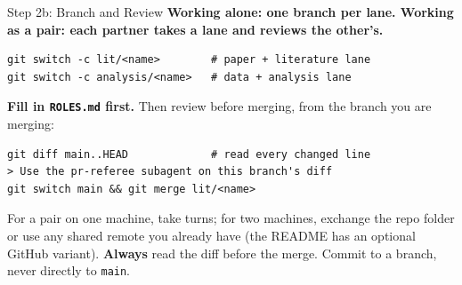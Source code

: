 \documentclass[aspectratio=169, 11pt]{beamer}
\begin{document}
\begin{frame}[fragile]{Step 2b: Branch and Review}
  \textbf{Working alone: one branch per lane. Working as a pair: each partner takes a lane and reviews the other's.}

  \vspace{0.3em}
  \begin{lstlisting}[basicstyle=\ttfamily\scriptsize]
git switch -c lit/<name>        # paper + literature lane
git switch -c analysis/<name>   # data + analysis lane
  \end{lstlisting}

  \vspace{0.3em}
  \textbf{Fill in \texttt{ROLES.md} first.} Then review before merging, from the branch you are merging:
  \begin{lstlisting}[basicstyle=\ttfamily\scriptsize]
git diff main..HEAD             # read every changed line
> Use the pr-referee subagent on this branch's diff
git switch main && git merge lit/<name>
  \end{lstlisting}

  \vspace{0.3em}
  {\small For a pair on one machine, take turns; for two machines, exchange the repo folder or use any shared remote you already have (the README has an optional GitHub variant). \textbf{Always} read the diff before the merge. Commit to a branch, never directly to \texttt{main}.}
\end{frame}
\end{document}
